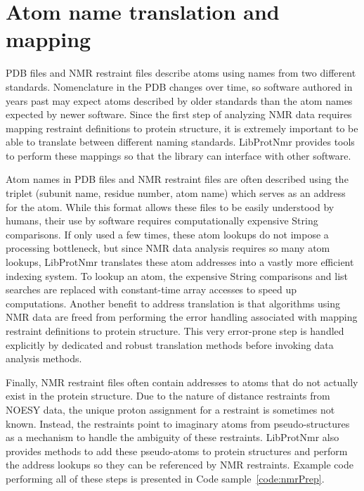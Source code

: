 \documentclass[11pt]{article}
\newcommand{\software}[1]{{\sc #1}}
\newcommand{\coderef}[1]{Code sample~\ref{#1}}
\newcommand{\libprotnmr}{\software{LibProtNmr}}
\begin{document}
\section{Atom name translation and mapping}

PDB files and NMR restraint files describe atoms using names from two different standards. Nomenclature in the PDB changes over time, so software authored in years past may expect atoms described by older standards than the atom names expected by newer software. Since the first step of analyzing NMR data requires mapping restraint definitions to protein structure, it is extremely important to be able to translate between different naming standards. {\libprotnmr} provides tools to perform these mappings so that the library can interface with other software.

Atom names in PDB files and NMR restraint files are often described using the triplet (subunit name, residue number, atom name) which serves as an address for the atom. While this format allows these files to be easily understood by humans, their use by software requires computationally expensive String comparisons. If only used a few times, these atom lookups do not impose a processing bottleneck, but since NMR data analysis requires so many atom lookups, {\libprotnmr} translates these atom addresses into a vastly more efficient indexing system. To lookup an atom, the expensive String comparisons and list searches are replaced with constant-time array accesses to speed up computations. Another benefit to address translation is that algorithms using NMR data are freed from performing the error handling associated with mapping restraint definitions to protein structure. This very error-prone step is handled explicitly by dedicated and robust translation methods before invoking data analysis methods.

Finally, NMR restraint files often contain addresses to atoms that do not actually exist in the protein structure. Due to the nature of distance restraints from NOESY data, the unique proton assignment for a restraint is sometimes not known. Instead, the restraints point to imaginary atoms from pseudo-structures as a mechanism to handle the ambiguity of these restraints. {\libprotnmr} also provides methods to add these pseudo-atoms to protein structures and perform the address lookups so they can be referenced by NMR restraints. Example code performing all of these steps is presented in \coderef{code:nmrPrep}.
\end{document}
